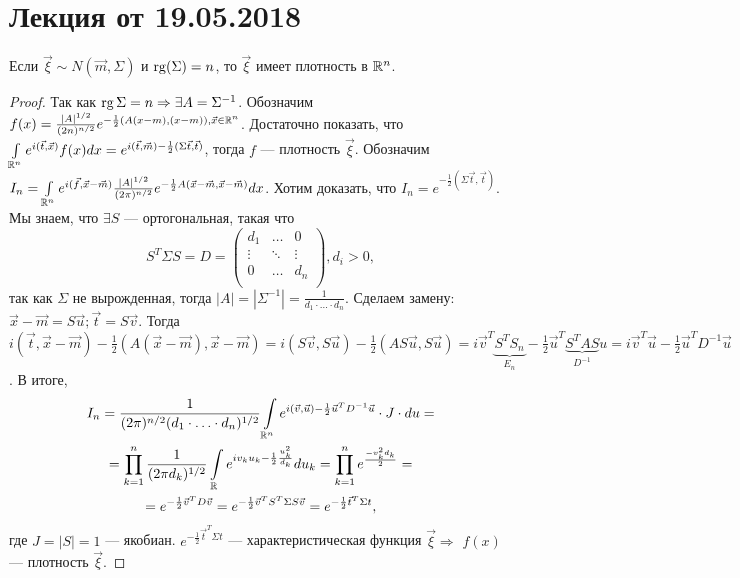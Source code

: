 \section{Лекция от 19.05.2018}
\begin{statement}[6-ое свойство]
	Если $\vec \xi \sim N(\vec m, \Sigma)$ и $\operatorname{rg}(\Sigma) = n$, то $\vec \xi$ имеет плотность в $\mathbb{R}^n$.
	\begin{proof}
		Так как $\operatorname{rg} \Sigma = n \Rightarrow \exists A = \Sigma^{-1}$. Обозначим $f(x) = \frac{|A|^{1/2}}{(2n)^{n / 2}} e^{-\frac{1}{2}(A(x - m), (x - m)), \vec x \in \mathbb{R}^n}$. Достаточно показать, что $\int\limits_{\mathbb{R}^n}e^{i(\vec t, \vec x)}f(x)dx = e^{i(\vec t, \vec m) - \frac{1}{2}(\Sigma \vec t, \vec t)}$, тогда $f$ --- плотность $\vec \xi$. Обозначим $I_n = \int\limits_{\mathbb{R}^n}e^{i(\vec f, \vec x - \vec m)} \frac{|A|^{1/2}}{(2\pi)^{n/2}}e^{-\frac{1}{2}A(\vec x - \vec m, \vec x - \vec m)}dx$. Хотим доказать, что $I_n = e^{-\frac{1}{2}(\Sigma\vec t, \vec t)}$. Мы знаем, что $\exists S$ --- ортогональная, такая что 
		$$ S^T\Sigma S = D = \left(\begin{matrix}
		d_1 & \ldots & 0 \\
		\vdots & \ddots & \vdots \\
		0 & \ldots & d_n \\
		\end{matrix}\right), d_i > 0, $$ 
		так как $\Sigma$ не вырожденная, тогда $|A| = |\Sigma^{-1}| = \frac{1}{d_1\cdot\ldots\cdot d_n}$. Сделаем замену: $\vec x - \vec m = S\vec u; \vec t = S\vec v$. Тогда $i(\vec t, \vec x - \vec m) - \frac{1}{2}(A(\vec x - \vec m), \vec x - \vec m) = i(S\vec v, S\vec u) - \frac{1}{2}(AS\vec u, S\vec u) = i\vec v^T\underbrace{S^TS_n}_{E_n} - \frac{1}{2}\vec u^T\underbrace{S^TAS}_{D^{-1}}u = i\vec v^T \vec u - \frac{1}{2}\vec u^TD^{-1}\vec u$. В итоге, 
		\begin{multline*}
		I_n = \frac{1}{(2\pi)^{n/2}(d_1 \cdot\ldots\cdot d_n)^{1/2}}\int\limits_{\mathbb{R}^n} e^{i(\vec v, \vec u)- \frac{1}{2}\vec u^TD^{-1}\vec u} \cdot J  \cdot du = \\
		= \prod\limits_{k = 1}^n\frac{1}{(2\pi d_k)^{1/2}} \int\limits_{\mathbb{R}} e^{i v_ku_k - \frac{1}{2}\frac{u_k^2}{d_k}}du_k = \prod\limits_{k = 1}^n e^{\frac{-v_k^2d_k}{2}} =  \\
		= e^{-\frac{1}{2}\vec v^TD\vec v} = e^{-\frac{1}{2}\vec v^TS^T\Sigma S\vec v} = e^{-\frac{1}{2}\vec t^T \Sigma t},
		\end{multline*} где $J = |S| = 1$ --- якобиан.  $e^{-\frac{1}{2}\vec t^T \Sigma t}$ --- характеристическая функция $\vec \xi \Rightarrow$ $f(x)$ --- плотность $\vec \xi$.
	\end{proof}
\end{statement}
